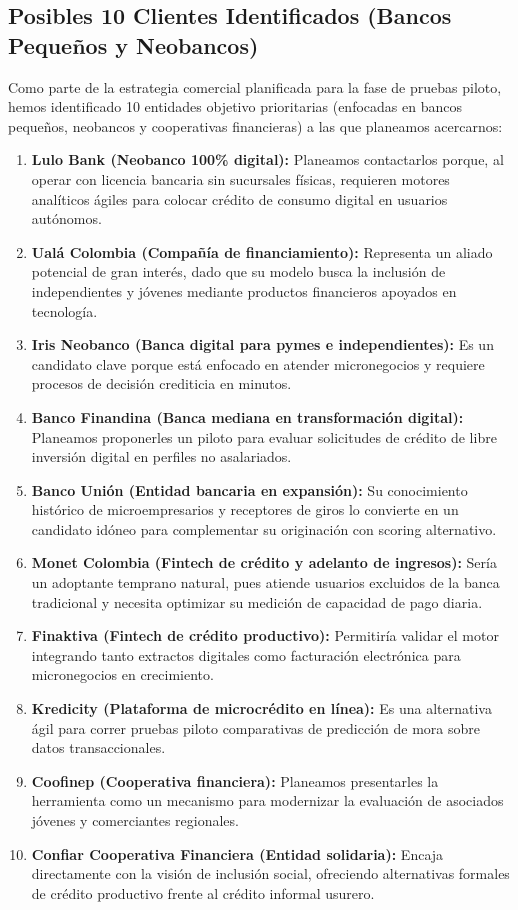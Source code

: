 \documentclass[11pt,a4paper]{article}
\begin{document}
\subsection{Posibles 10 Clientes Identificados (Bancos Peque\~nos y Neobancos)}
Como parte de la estrategia comercial planificada para la fase de pruebas piloto, hemos identificado 10 entidades objetivo prioritarias (enfocadas en bancos peque\~nos, neobancos y cooperativas financieras) a las que planeamos acercarnos:

\begin{enumerate}[leftmargin=*]
    \item \textbf{Lulo Bank (Neobanco 100\% digital):} Planeamos contactarlos porque, al operar con licencia bancaria sin sucursales f\'isicas, requieren motores anal\'iticos \'agiles para colocar cr\'edito de consumo digital en usuarios aut\'onomos.
    \item \textbf{Ual\'a Colombia (Compa\~n\'ia de financiamiento):} Representa un aliado potencial de gran inter\'es, dado que su modelo busca la inclusi\'on de independientes y j\'ovenes mediante productos financieros apoyados en tecnolog\'ia.
    \item \textbf{Iris Neobanco (Banca digital para pymes e independientes):} Es un candidato clave porque est\'a enfocado en atender micronegocios y requiere procesos de decisi\'on crediticia en minutos.
    \item \textbf{Banco Finandina (Banca mediana en transformaci\'on digital):} Planeamos proponerles un piloto para evaluar solicitudes de cr\'edito de libre inversi\'on digital en perfiles no asalariados.
    \item \textbf{Banco Uni\'on (Entidad bancaria en expansi\'on):} Su conocimiento hist\'orico de microempresarios y receptores de giros lo convierte en un candidato id\'oneo para complementar su originaci\'on con scoring alternativo.
    \item \textbf{Monet Colombia (Fintech de cr\'edito y adelanto de ingresos):} Ser\'ia un adoptante temprano natural, pues atiende usuarios excluidos de la banca tradicional y necesita optimizar su medici\'on de capacidad de pago diaria.
    \item \textbf{Finaktiva (Fintech de cr\'edito productivo):} Permitir\'ia validar el motor integrando tanto extractos digitales como facturaci\'on electr\'onica para micronegocios en crecimiento.
    \item \textbf{Kredicity (Plataforma de microcr\'edito en l\'inea):} Es una alternativa \'agil para correr pruebas piloto comparativas de predicci\'on de mora sobre datos transaccionales.
    \item \textbf{Coofinep (Cooperativa financiera):} Planeamos presentarles la herramienta como un mecanismo para modernizar la evaluaci\'on de asociados j\'ovenes y comerciantes regionales.
    \item \textbf{Confiar Cooperativa Financiera (Entidad solidaria):} Encaja directamente con la visi\'on de inclusi\'on social, ofreciendo alternativas formales de cr\'edito productivo frente al cr\'edito informal usurero.
\end{enumerate}
\end{document}
